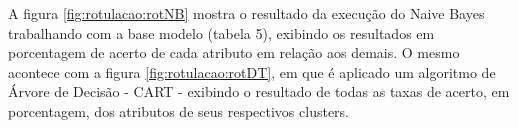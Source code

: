 

A figura \ref{fig:rotulacao:rotNB} mostra o resultado da execução do Naive Bayes trabalhando com a base modelo (tabela 5), exibindo os resultados em porcentagem de acerto de cada atributo em relação aos demais. O mesmo acontece com a figura \ref{fig:rotulacao:rotDT}, em que é aplicado um algoritmo de Árvore de Decisão - CART - exibindo o resultado de todas as taxas de acerto, em porcentagem, dos atributos de seus respectivos clusters. 




